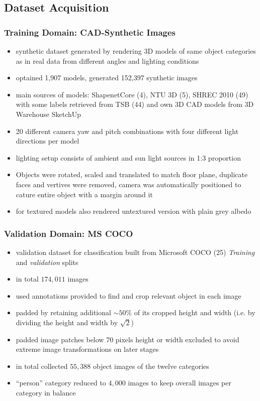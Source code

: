 \subsection{Dataset Acquisition}
\subsubsection{Training Domain: CAD-Synthetic Images}
\begin{itemize}
	\item synthetic dataset generated by rendering 3D models of same object categories as in real data from different angles and lighting conditions
	\item optained 1,907 models, generated 152,397 synthetic images
	\item main sources of models: ShapenetCore (4), NTU 3D (5), SHREC 2010 (49) with some labels retrieved from TSB (44) and own 3D CAD models from 3D Warehouse SketchUp
	\item 20 different camera yaw and pitch combinations with four different light directions per model
	\item lighting setup consists of ambient and sun light sources in 1:3 proportion
	\item Objects were rotated, scaled and translated to match floor plane, duplicate faces and vertives were removed, camera was automatically positioned to cature entire object with a margin around it
	\item for textured models also rendered untextured version with plain grey albedo
\end{itemize}

\subsubsection{Validation Domain: MS COCO}
\begin{itemize}
	\item validation dataset for classification built from Microsoft COCO (25) \textit{Training} and \textit{validation} splits
	\item in total $174,011$ images
	\item used annotations provided to find and crop relevant object in each image
	\item padded by retaining additional $\sim 50\%$ of its cropped height and width (i.e. by dividing the height and width by $\sqrt{2}$)
	\item padded image patches below 70 pixels height or width excluded to avoid extreme image transformations on later stages
	\item in total collected $55,388$ object images of the twelve categories
	\item ``person'' category reduced to $4,000$ images to keep overall images per category in balance
\end{itemize}


